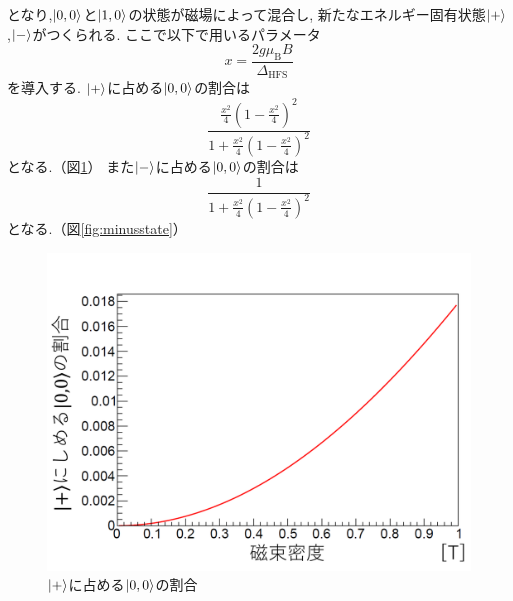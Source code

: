となり,$\ket{0,0}$と$\ket{1,0}$の状態が磁場によって混合し,
新たなエネルギー固有状態$\ket{+}$,$\ket{-}$がつくられる.
ここで以下で用いるパラメータ
\begin{equation}
	\nonumber
	x = \frac{2g\mu_{\mathrm{B}}B}{\Delta_{\mathrm{HFS}}}
\end{equation}
を導入する.
$\ket{+}$に占める$\ket{0,0}$の割合は
\begin{equation}
	\nonumber
\frac{ \frac{x^{2}}{4} \left(1-\frac{x^{2}}{4}\right)^{2}  }{  1+\frac{x^{2}}{4}\left( 1-\frac{x^{2}}{4} \right)^2   }
\end{equation}
となる.（図\ref{fig:plusstate}）
また$\ket{-}$に占める$\ket{0,0}$の割合は
\begin{equation}
	\nonumber
\frac{1}{1+\frac{x^{2}}{4}\left(1-\frac{x^{2}}{4}\right)^{2}}
\end{equation}
となる.（図\ref{fig:minusstate}）

\begin{figure}[H]
\centering
\includegraphics[keepaspectratio,scale=0.5]{fig/ybm/plusstate.pdf}
\caption{$\ket{+}$に占める$\ket{0,0}$の割合}
\label{fig:plusstate}
\end{figure}

